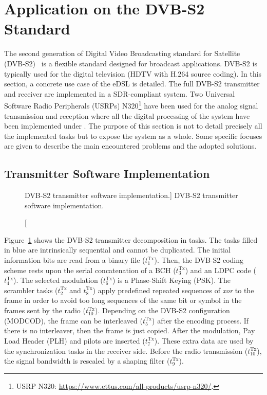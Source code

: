 \section{Application on the DVB-S2 Standard}

The second generation of Digital Video Broadcasting standard for Satellite
(DVB-S2)~\cite{ETSI2005} is a flexible standard designed for broadcast
applications. DVB-S2 is typically used for the digital television (HDTV with
H.264 source coding). In this section, a concrete use case of the \AFFECT eDSL
is detailed. The full DVB-S2 transmitter and receiver are implemented in a
SDR-compliant system. Two Universal Software Radio Peripherals (USRPs)
N320\footnote{USRP N320: \url{https://www.ettus.com/all-products/usrp-n320/}.}
have been used for the analog signal transmission and reception where all
the digital processing of the system have been implemented under \AFFECT. The
purpose of this section is not to detail precisely all the implemented tasks
but to expose the system as a whole. Some specific focuses are given to describe
the main encountered problems and the adopted solutions.

\subsection{Transmitter Software Implementation}

\begin{figure}[htp]
  \centering
  \caption
    [DVB-S2 transmitter software implementation.]
    {DVB-S2 transmitter software implementation.}
  \label{fig:sdr_dvbs2_transmitter}
\end{figure}

Figure~\ref{fig:sdr_dvbs2_transmitter} shows the DVB-S2 transmitter
decomposition in tasks. The tasks filled in blue are intrinsically sequential
and cannot be duplicated. The initial information bits are read from a binary
file ($t^\text{Tx}_1$). Then, the DVB-S2 coding scheme rests upon the serial
concatenation of a BCH ($t^\text{Tx}_3$) and an LDPC code ($t^\text{Tx}_4$). The
selected modulation ($t^\text{Tx}_6$) is a Phase-Shift Keying (PSK). The
scrambler tasks ($t^\text{Tx}_2$ and $t^\text{Tx}_8$) apply predefined repeated
sequences of \emph{xor} to the frame in order to avoid too long sequences of the
same bit or symbol in the frames sent by the radio ($t^\text{Tx}_{10}$).
Depending on the DVB-S2 configuration (MODCOD), the frame can be interleaved
($t^\text{Tx}_5$) after the encoding process. If there is no interleaver, then
the frame is just copied. After the modulation, Pay Load Header (PLH) and
pilots are inserted ($t^\text{Tx}_7$). These extra data are used by the
synchronization tasks in the receiver side. Before the radio transmission
($t^\text{Tx}_{10}$), the signal bandwidth is rescaled by a shaping filter
($t^\text{Tx}_9$).

